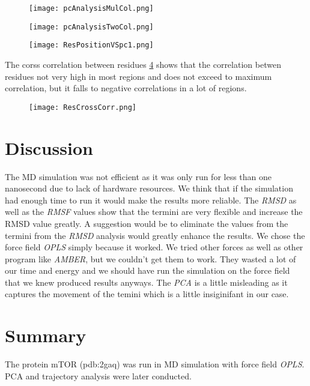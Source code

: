 \documentclass{article}
\begin{document}
\begin{figure}[H]
          \centering
          \texttt{[image: pcAnalysisMulCol.png]}
          \label{fig:pcamul}
\end{figure}


\begin{figure}[H]
          \centering
          \texttt{[image: pcAnalysisTwoCol.png]}
          \label{fig:pcatwo}
\end{figure}


\begin{figure}[H]
          \centering
          \texttt{[image: ResPositionVSpc1.png]}
          \label{fig:respc}
\end{figure}

The corss correlation between residues \cref{fig:crosscorr} shows that the correlation betwen residues not very high in most regions and does not exceed to maximum correlation, but it falls to negative correlations in a lot of regions.
\begin{figure}[H]
          \centering
          \texttt{[image: ResCrossCorr.png]}
          \label{fig:crosscorr}
\end{figure}




 \section{Discussion} %
 \label{sec:disc}
  The MD simulation was not efficient as it was only run for less than one nanosecond due to lack of hardware resources. We think that if the simulation had enough time to run it would make the results more reliable. The \emph{RMSD} as well as the \emph{RMSF} values show that the termini are very flexible and increase the RMSD value greatly. A suggestion would be to eliminate the values from the termini from the \emph{RMSD} analysis would greatly enhance the results. We chose the force field \emph{OPLS} simply because it worked. We tried other forces as well as other program like \emph{AMBER}, but we couldn't get them to work. They wasted a lot of our time and energy and we should have run the simulation on the force field that we knew produced results anyways. The \emph{PCA} is a little misleading as it captures the movement of the temini which is a little insiginifant in our case.


 \section{Summary}
 \label{sec:sum}
 The protein mTOR (pdb:2gaq) was run in MD simulation with force field \emph{OPLS}. PCA and trajectory analysis were later conducted.
 


%
 
\end{document}
